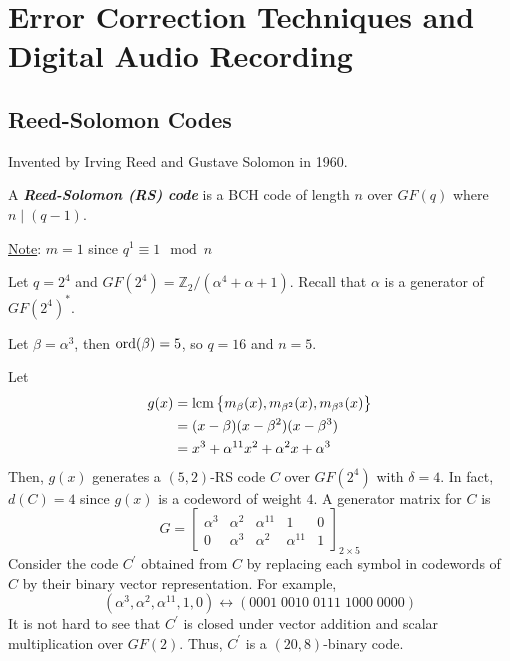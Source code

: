 \chapter{Error Correction Techniques and Digital Audio Recording}
\section{Reed-Solomon Codes}
Invented by Irving Reed and Gustave Solomon in 1960.
\begin{defbox}
    \begin{definition}
        A \textbf{\emph{Reed-Solomon (RS) code}} is a BCH code
        of length $ n $ over $ GF(q) $ where $ n\mid (q-1) $.

        \underline{Note}: $ m=1 $ since $ q^1\equiv 1\mod n $
    \end{definition}
\end{defbox}
\begin{exbox}
    \begin{example}
        Let $ q=2^4 $ and $ GF(2^4)=\mathbb{Z}_2/(\alpha^4+\alpha+1) $.
        Recall that $ \alpha $ is a generator of $ GF(2^4)^* $.

        Let $ \beta=\alpha^3 $, then $ \operatorname{ord}(\beta)=5 $, so $ q=16 $
        and $ n=5 $.

        Let
        \begin{align*}
            g(x) & =\operatorname{lcm} \left\{ m_{\beta}(x),m_{\beta^2}(x),m_{\beta^3}(x)\right\} \\
                 & =(x-\beta)(x-\beta^2)(x-\beta^3)                                 \\
                 & =x^3+\alpha^{11}x^2+\alpha^2x+\alpha^3
        \end{align*}
        Then, $ g(x) $ generates a $ (5,2) $-RS code $ C $ over $ GF(2^4) $
        with $ \delta=4 $. In fact, $ d(C)=4 $ since $ g(x) $
        is a codeword of weight $ 4 $. A generator matrix for $ C $ is
        \[ G=
            \begin{bmatrix}
                \alpha^3 & \alpha^2 & \alpha^{11} & 1           & 0 \\
                0        & \alpha^3 & \alpha^2    & \alpha^{11} & 1
            \end{bmatrix}_{2\times 5} \]
        Consider the code $ C^{\prime} $ obtained from $ C $
        by replacing each symbol in codewords of $ C $ by their binary vector representation.
        For example,
        \[ (\alpha^3,\alpha^2,\alpha^{11},1,0)\longleftrightarrow (0001\; 0010\; 0111\; 1000\; 0000) \]
        It is not hard to see that $ C^{\prime} $ is closed under vector addition and scalar
        multiplication over $ GF(2) $. Thus, $ C^{\prime} $ is a $ (20,8) $-binary code.
    \end{example}
\end{exbox}
